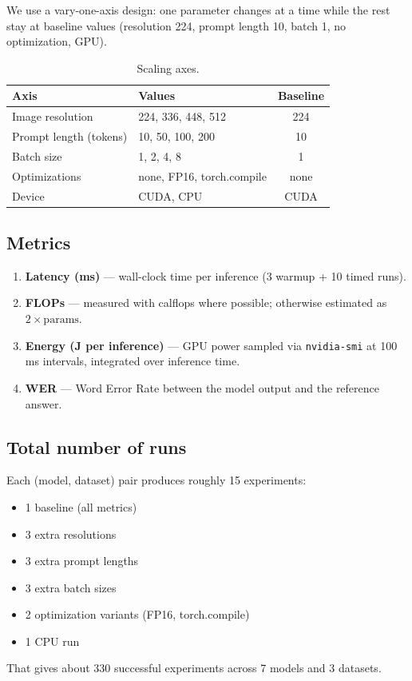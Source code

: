 \documentclass[12pt,a4paper]{article}
\begin{document}
We use a vary-one-axis design: one parameter changes at a time while the rest stay at baseline values (resolution 224, prompt length 10, batch 1, no optimization, GPU).

\begin{table}[H]
\centering
\caption{Scaling axes.}
\begin{tabular}{@{}llc@{}}
\toprule
Axis & Values & Baseline \\
\midrule
Image resolution & 224, 336, 448, 512 & 224 \\
Prompt length (tokens) & 10, 50, 100, 200 & 10 \\
Batch size & 1, 2, 4, 8 & 1 \\
Optimizations & none, FP16, torch.compile & none \\
Device & CUDA, CPU & CUDA \\
\bottomrule
\end{tabular}
\end{table}

\subsection{Metrics}

\begin{enumerate}[nosep]
  \item \textbf{Latency (ms)} --- wall-clock time per inference (3 warmup + 10 timed runs).
  \item \textbf{FLOPs} --- measured with calflops where possible; otherwise estimated as $2 \times \text{params}$.
  \item \textbf{Energy (J per inference)} --- GPU power sampled via \texttt{nvidia-smi} at 100\,ms intervals, integrated over inference time.
  \item \textbf{WER} --- Word Error Rate between the model output and the reference answer.
\end{enumerate}

\subsection{Total number of runs}

Each (model, dataset) pair produces roughly 15 experiments:
\begin{itemize}[nosep]
  \item 1 baseline (all metrics)
  \item 3 extra resolutions
  \item 3 extra prompt lengths
  \item 3 extra batch sizes
  \item 2 optimization variants (FP16, torch.compile)
  \item 1 CPU run
\end{itemize}
That gives about 330 successful experiments across 7 models and 3 datasets.
\end{document}
